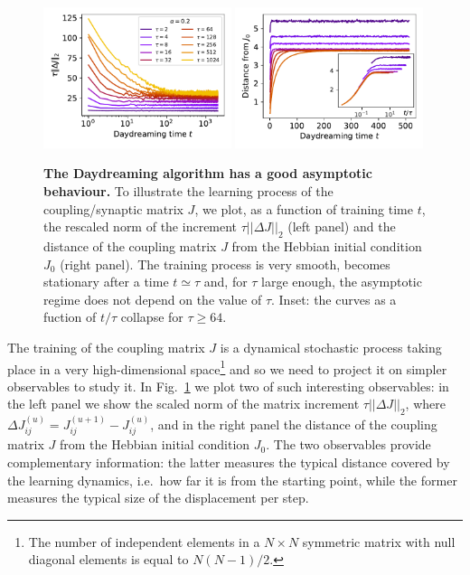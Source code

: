 \documentclass[a4paper]{cas-sc}
\begin{document}
\begin{figure}[t]
\centering
\includegraphics[width=0.49\textwidth,clip]{fig1a}
\includegraphics[width=0.49\textwidth]{Fig_insetplot.pdf}
\caption{ 
\textbf{The Daydreaming algorithm has a good asymptotic behaviour.} 
To illustrate the learning process of the coupling/synaptic matrix $J$, we plot, as a function of training time $t$, the rescaled norm of the increment  $\tau ||\Delta J||_2$ (left panel) and the distance of the coupling matrix $J$ from the Hebbian initial condition $J_0$ (right panel). The training process is very smooth, becomes stationary after a time $t\simeq \tau$ and,  for $\tau$ large enough, the asymptotic regime does not depend on the value of $\tau$. Inset: the curves as a fuction of $t/\tau$ collapse for $\tau \geq 64$. }
\label{fig:asymptotic}
\end{figure}

The training of the coupling  matrix $J$ is a dynamical stochastic process taking place in a very high-dimensional space\footnote{The number of independent elements in a $N\times N$ symmetric matrix with null diagonal elements is equal to $N(N-1)/2$.} and so we need to project it on simpler observables to study it.
In Fig.~\ref{fig:asymptotic} we plot two of such interesting observables: in the left panel we show the scaled norm of the matrix increment $\tau ||\Delta J||_2$, where  $\Delta J_{ij}^{(u)}=J_{ij}^{(u+1)}-J_{ij}^{(u)}$, and in the right panel the distance of the coupling matrix $J$ from the Hebbian initial condition $J_0$. The two observables provide complementary information: the latter measures the typical distance covered by the learning dynamics, i.e.\ how far it is from the starting point, while the former measures the typical size of the displacement per step.
\end{document}
